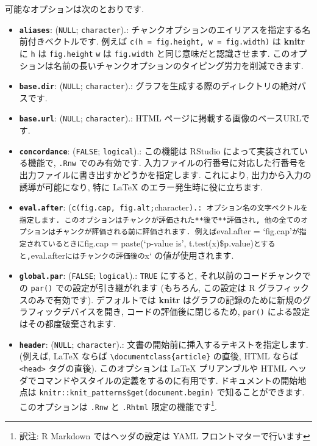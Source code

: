 \documentclass[
  11pt,
  lualatex,
  ja=standard]{bxjsreport}
\providecommand{\tightlist}{%
  \setlength{\itemsep}{0pt}\setlength{\parskip}{0pt}}
\begin{document}
可能なオプションは次のとおりです.

\begin{itemize}
\tightlist
\item
  \textbf{\texttt{aliases}}: (\texttt{NULL}; \texttt{character}).: チャンクオプションのエイリアスを指定する名前付きベクトルです. 例えば \texttt{c(h = \textquotesingle{}fig.height\textquotesingle{},\ w\ =\ \textquotesingle{}fig.width\textquotesingle{})} は \textbf{knitr} に \texttt{h} は \texttt{fig.height} \texttt{w} は \texttt{fig.width} と同じ意味だと認識させます. このオプションは名前の長いチャンクオプションのタイピング労力を削減できます.
\item
  \textbf{\texttt{base.dir}}: (\texttt{NULL}; \texttt{character}).: グラフを生成する際のディレクトリの絶対パスです.
\item
  \textbf{\texttt{base.url}}: (\texttt{NULL}; \texttt{character}).: HTML ページに掲載する画像のベースURLです.
\item
  \textbf{\texttt{concordance}}: (\texttt{FALSE}; \texttt{logical}).: この機能は RStudio によって実装されている機能で, \texttt{.Rnw} でのみ有効です. 入力ファイルの行番号に対応した行番号を出力ファイルに書き出すかどうかを指定します. これにより, 出力から入力の誘導が可能になり, 特に LaTeX のエラー発生時に役に立ちます.
\item
  \textbf{\texttt{eval.after}}: (\texttt{c(\textquotesingle{}fig.cap\textquotesingle{},\ \textquotesingle{}fig.alt\textquotesingle{};}character\texttt{).: オプション名の文字ベクトルを指定します. このオプションはチャンクが評価された**後で**評価され, 他の全てのオプションはチャンクが評価される前に評価されます. 例えば}eval.after = `fig.cap'\texttt{が指定されているときに}fig.cap = paste(`p-value is', t.test(x)\$p.value)\texttt{とすると,}eval.after\texttt{にはチャンクの評価後の}x` の値が使用されます.
\item
  \textbf{\texttt{global.par}}: (\texttt{FALSE}; \texttt{logical}).: \texttt{TRUE} にすると, それ以前のコードチャンクでの \texttt{par()} での設定が引き継がれます (もちろん, この設定は R グラフィックスのみで有効です). デフォルトでは \textbf{knitr} はグラフの記録のために新規のグラフィックデバイスを開き, コードの評価後に閉じるため, \texttt{par()} による設定はその都度破棄されます.
\item
  \textbf{\texttt{header}}: (\texttt{NULL}; \texttt{character}).: 文書の開始前に挿入するテキストを指定します. (例えば, LaTeX ならば \texttt{\textbackslash{}documentclass\{article\}} の直後, HTML ならば \texttt{\textless{}head\textgreater{}} タグの直後). このオプションは LaTeX プリアンブルや HTML ヘッダでコマンドやスタイルの定義をするのに有用です. ドキュメントの開始地点は \texttt{knitr::knit\_patterns\$get(\textquotesingle{}document.begin\textquotesingle{})} で知ることができます. このオプションは \texttt{.Rnw} と \texttt{.Rhtml} 限定の機能です\footnote{訳注: R Markdown ではヘッダの設定は YAML フロントマターで行います}.

\end{itemize}
\end{document}
